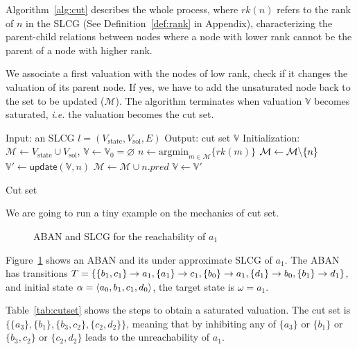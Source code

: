 Algorithm~\ref{alg:cut} describes the whole process, where $rk(n)$ refers to the rank of $n$ in the SLCG (See Definition~\ref{def:rank} in Appendix), characterizing the parent-child relations between nodes where a node with lower rank cannot be the parent of a node with higher rank.

We associate a first valuation with the nodes of low rank, check if it changes the valuation of its parent node.
If yes, we have to add the unsaturated node back to the set to be updated ($\mathcal{M}$).
The algorithm terminates when valuation $\mathbb{V}$ becomes saturated, \textit{i.e.} the valuation becomes the cut set.

\begin{algorithm}[ht]
\begin{algorithmic}
\State Input: an SLCG $l= (V_{\mathrm{state}},V_{\mathrm{sol}},E)$
\State Output: cut set $\mathbb{V}$
\State Initialization: $\mathcal{M}\gets V_{\mathrm{state}}\cup V_{\mathrm{sol}}$, $\mathbb{V}\gets\mathbb{V}_0=\varnothing$
        \State $n\gets\mathrm{argmin}_{m\in\mathcal{M}}\{rk(m)\}$
		\State $\mathcal{M}\gets\mathcal{M}\miset{n}$
		\State $\mathbb{V}'\gets\mathsf{update}(\mathbb{V},n)$
		    \State $\mathcal{M}\gets\mathcal{M}\cup n.pred$
		\EndIf
		\State $\mathbb{V}\gets\mathbb{V}'$
\EndWhile
\State {} 
\end{algorithmic}
\caption{Cut set}\label{alg:cut}
\end{algorithm}

We are going to run a tiny example on the mechanics of cut set.

\begin{figure}[ht]
\centering

\caption[Example of cut set]{ABAN and SLCG for the reachability of $a_1$}\label{fig:cut}
\end{figure}

\begin{example}\label{example:cutset}
Figure~\ref{fig:cut} shows an ABAN and its under approximate SLCG of $a_1$.
The ABAN has transitions $T=\{\{b_1,c_1\}\rightarrow a_1,\{a_1\}\rightarrow c_1,\{b_0\}\rightarrow a_1,\{d_1\}\rightarrow b_0,\{b_1\}\rightarrow d_1\}$, and initial state $\alpha= \langle a_0,b_1,c_1,d_0\rangle$, the target state is $\omega=a_1$.


Table~\ref{tab:cutset} shows the steps to obtain a saturated valuation.
The cut set is $\{\{a_3\},\{b_1\},\{b_3,c_2\},\{c_2,d_2\}\}$, meaning that by inhibiting any of $\{a_3\}$ or $\{b_1\}$ or $\{b_3,c_2\}$ or $\{c_2,d_2\}$ leads to the unreachability of $a_1$.

\end{example}

